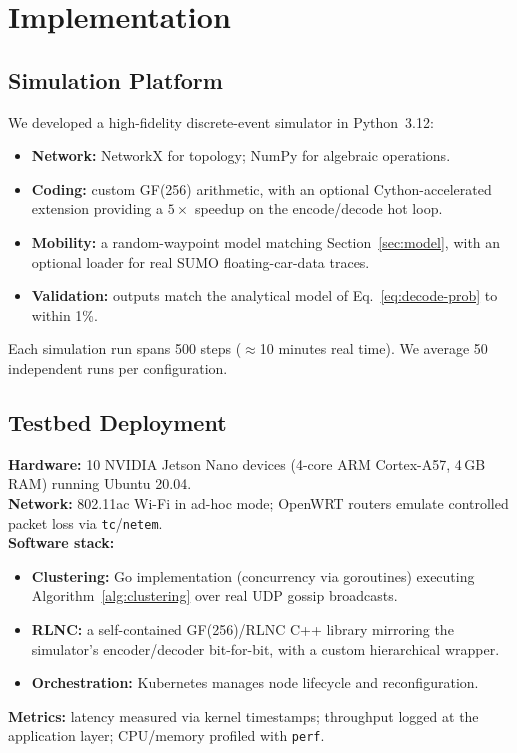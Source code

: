 \documentclass[journal]{IEEEtran}
\begin{document}
\section{Implementation}
\label{sec:implementation}

\subsection{Simulation Platform}
We developed a high-fidelity discrete-event simulator in Python~3.12:
\begin{itemize}
\item \textbf{Network:} NetworkX for topology; NumPy for algebraic operations.
\item \textbf{Coding:} custom GF(256) arithmetic, with an optional Cython-accelerated extension providing a $5\times$ speedup on the encode/decode hot loop.
\item \textbf{Mobility:} a random-waypoint model matching Section~\ref{sec:model}, with an optional loader for real SUMO floating-car-data traces.
\item \textbf{Validation:} outputs match the analytical model of Eq.~\eqref{eq:decode-prob} to within 1\%.
\end{itemize}
Each simulation run spans 500 steps ($\approx$10 minutes real time). We average 50 independent runs per configuration.

\subsection{Testbed Deployment}
\textbf{Hardware:} 10 NVIDIA Jetson Nano devices (4-core ARM Cortex-A57, 4\,GB RAM) running Ubuntu 20.04.\\
\textbf{Network:} 802.11ac Wi-Fi in ad-hoc mode; OpenWRT routers emulate controlled packet loss via \texttt{tc}/\texttt{netem}.\\
\textbf{Software stack:}
\begin{itemize}
\item \textbf{Clustering:} Go implementation (concurrency via goroutines) executing Algorithm~\ref{alg:clustering} over real UDP gossip broadcasts.
\item \textbf{RLNC:} a self-contained GF(256)/RLNC C++ library mirroring the simulator's encoder/decoder bit-for-bit, with a custom hierarchical wrapper.
\item \textbf{Orchestration:} Kubernetes manages node lifecycle and reconfiguration.
\end{itemize}
\textbf{Metrics:} latency measured via kernel timestamps; throughput logged at the application layer; CPU/memory profiled with \texttt{perf}.
\end{document}
